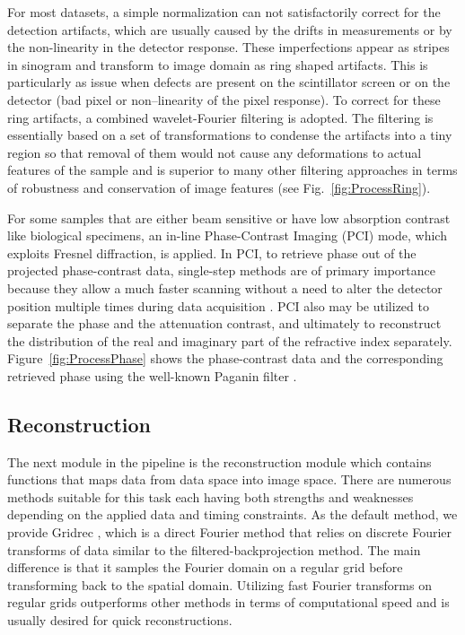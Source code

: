\documentclass[pdf]{iucr}              %
\begin{document}
For most datasets, a simple normalization can not satisfactorily correct for the detection artifacts, which are usually caused by the drifts in measurements or by the non-linearity in the detector response. These imperfections appear as stripes in sinogram and transform to image domain as ring shaped artifacts. This is particularly as issue when defects are present on the scintillator screen or on the detector (bad pixel or non--linearity of the pixel response). To correct for these ring artifacts, a combined wavelet-Fourier filtering  \cite{Munch:09} is adopted. The filtering is essentially based on a set of transformations to condense the artifacts into a tiny region so that removal of them would not cause any deformations to actual features of the sample and is superior to many other filtering approaches in terms of robustness and conservation of image features (see Fig.~\ref{fig:ProcessRing}).

For some samples that are either beam sensitive or have low absorption contrast like biological specimens, an in-line Phase-Contrast Imaging (PCI) mode, which exploits Fresnel diffraction, is applied. In PCI, to retrieve phase out of the projected phase-contrast data, single-step methods are of primary importance because they allow a much faster scanning without a need to alter the detector position multiple times during data acquisition \cite{Burvall:11}. PCI also may be utilized to separate the phase and the attenuation contrast, and ultimately to reconstruct the distribution of the real and imaginary part of the refractive index separately. Figure~\ref{fig:ProcessPhase} shows the phase-contrast data and the corresponding retrieved phase using the well-known Paganin filter \cite{Paganin_2002}.


\subsection{Reconstruction}

The next module in the pipeline is the reconstruction module which contains functions that maps data from data space into image space. There are numerous methods suitable for this task each having both strengths and weaknesses depending on the applied data and timing constraints. As the default method, we provide Gridrec \cite{donath_spie_2006}, which is a direct Fourier method that relies on discrete Fourier transforms of data similar to the filtered-backprojection method. The main difference is that it samples the Fourier domain on a regular grid before transforming back to the spatial domain. Utilizing fast Fourier transforms on regular grids outperforms other methods in terms of computational speed and is usually desired for quick reconstructions.
\end{document}
